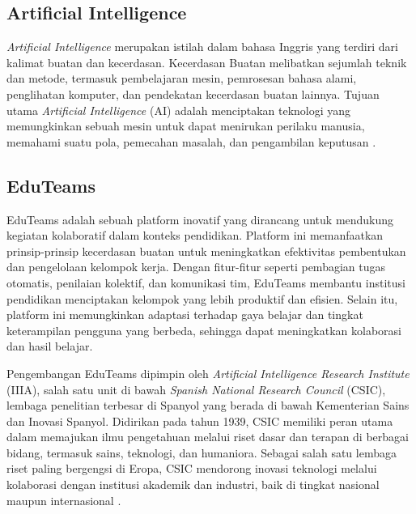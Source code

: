 \subsection{Artificial Intelligence} \label{II.Teori3}
\textit{Artificial Intelligence} merupakan istilah dalam bahasa Inggris yang terdiri dari kalimat buatan dan kecerdasan. Kecerdasan Buatan melibatkan sejumlah teknik dan metode, termasuk pembelajaran mesin, pemrosesan bahasa alami, penglihatan komputer, dan pendekatan kecerdasan buatan lainnya. Tujuan utama \textit{Artificial Intelligence} (AI) adalah menciptakan teknologi yang memungkinkan sebuah mesin untuk dapat menirukan perilaku manusia, memahami suatu pola, pemecahan masalah, dan pengambilan keputusan \cite{IBM_AI}.

\subsection{EduTeams} \label{II.Teori4}
EduTeams adalah sebuah platform inovatif yang dirancang untuk mendukung kegiatan kolaboratif dalam konteks pendidikan. Platform ini memanfaatkan prinsip-prinsip kecerdasan buatan untuk meningkatkan efektivitas pembentukan dan pengelolaan kelompok kerja. Dengan fitur-fitur seperti pembagian tugas otomatis, penilaian kolektif, dan komunikasi tim, EduTeams membantu institusi pendidikan menciptakan kelompok yang lebih produktif dan efisien. Selain itu, platform ini memungkinkan adaptasi terhadap gaya belajar dan tingkat keterampilan pengguna yang berbeda, sehingga dapat meningkatkan kolaborasi dan hasil belajar.

Pengembangan EduTeams dipimpin oleh \textit{Artificial Intelligence Research Institute} (IIIA), salah satu unit di bawah \textit{Spanish National Research Council} (CSIC), lembaga penelitian terbesar di Spanyol yang berada di bawah Kementerian Sains dan Inovasi Spanyol. Didirikan pada tahun 1939, CSIC memiliki peran utama dalam memajukan ilmu pengetahuan melalui riset dasar dan terapan di berbagai bidang, termasuk sains, teknologi, dan humaniora. Sebagai salah satu lembaga riset paling bergengsi di Eropa, CSIC mendorong inovasi teknologi melalui kolaborasi dengan institusi akademik dan industri, baik di tingkat nasional maupun internasional \cite{Bernal2011}.

